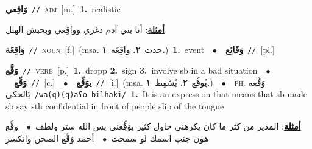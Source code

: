 \documentclass[10pt,a4paper,twoside]{article} %
\begin{document}
\begin{multicols}{2}
{\setlength\topsep{0pt}\textbf{\foreignlanguage{arabic}{وَاقِعي}}\ {\color{gray}\texttt{//}\color{black}}\ \textsc{adj}\ [m.]\ \textbf{1.}~realistic\  \begin{flushright}\color{gray}\foreignlanguage{arabic}{\textbf{\underline{\foreignlanguage{arabic}{أمثلة}}}: أنا بني آدم دغري وواقِعي وبحبش الهبل}\end{flushright}\color{black}} \vspace{2mm}

{\setlength\topsep{0pt}\textbf{\foreignlanguage{arabic}{وَاقِعَة}}\ {\color{gray}\texttt{//}\color{black}}\ \textsc{noun}\ [f.]\ \color{gray}(msa. \foreignlanguage{arabic}{حدث}~\foreignlanguage{arabic}{\textbf{٢.}}  \foreignlanguage{arabic}{واقِعَة}~\foreignlanguage{arabic}{\textbf{١.}})\color{black}\ \textbf{1.}~event\ \ $\bullet$\ \ \setlength\topsep{0pt}\textbf{\foreignlanguage{arabic}{وَقَائِع}}\ {\color{gray}\texttt{//}\color{black}}\ [pl.]\ } \vspace{2mm}

{\setlength\topsep{0pt}\textbf{\foreignlanguage{arabic}{وَقَّع}}\ {\color{gray}\texttt{//}\color{black}}\ \textsc{verb}\ [p.]\ \textbf{1.}~dropp  \textbf{2.}~sign  \textbf{3.}~involve sb in a bad situation\ \ $\bullet$\ \ \setlength\topsep{0pt}\textbf{\foreignlanguage{arabic}{وَقِّع}}\ {\color{gray}\texttt{//}\color{black}}\ [c.]\ \ $\bullet$\ \ \setlength\topsep{0pt}\textbf{\foreignlanguage{arabic}{يوَقِّع}}\ {\color{gray}\texttt{//}\color{black}}\ [i.]\ \color{gray}(msa. \foreignlanguage{arabic}{يُوقِّع}~\foreignlanguage{arabic}{\textbf{٢.}}  \foreignlanguage{arabic}{يُسْقِط}~\foreignlanguage{arabic}{\textbf{١.}})\color{black}\ \ $\bullet$\ \ \textsc{ph.} \color{gray} \foreignlanguage{arabic}{وَقَّعه بَالحكي}\color{black}\ {\color{gray}\texttt{/{\sffamily wa(q)(q)aʕo bilħaki}/}\color{black}}\ \textbf{1.}~It is an expression that means that sb made sb say sth confidential in front of people slip of the tongue\  \begin{flushright}\color{gray}\foreignlanguage{arabic}{\textbf{\underline{\foreignlanguage{arabic}{أمثلة}}}: المدير من كثر ما كان يكرهني حاول كثير يوَقِِّعني بس الله ستر ولطف\ $\bullet$\ \  وقَّع هون جنب اسمك لو سمحت\ $\bullet$\ \  أحمد وَقَّع الصحن وانكسر}\end{flushright}\color{black}} \vspace{2mm}


\end{multicols}
\end{document}
